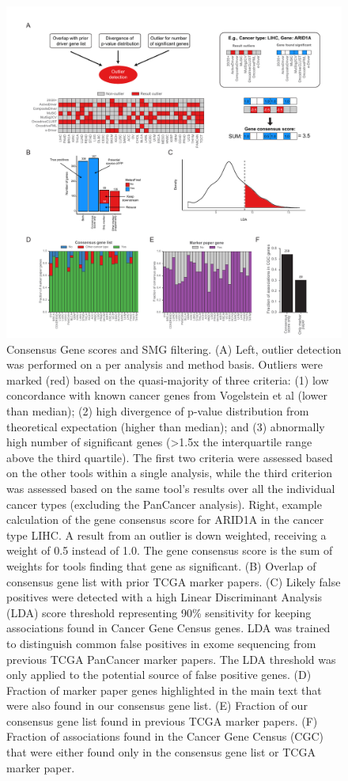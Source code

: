 \begin{figure}
  \centering
  \makeatletter
  \let\@currsize\normalsize
  \includegraphics[width=\linewidth]{figures/chapter7/driver_gene_approach.pdf}
  \caption[Consensus Gene scores and SMG filtering.]{Consensus Gene scores and SMG filtering. (A) Left, outlier detection was performed on a per analysis and method basis. Outliers were marked (red) based on the quasi-majority of three criteria: (1) low concordance with known cancer genes from Vogelstein et al (lower than median); (2) high divergence of p-value distribution from theoretical expectation (higher than median); and (3) abnormally high number of significant genes (>1.5x the interquartile range above the third quartile). The first two criteria were assessed based on the other tools within a single analysis, while the third criterion was assessed based on the same tool's results over all the individual cancer types (excluding the PanCancer analysis). Right, example calculation of the gene consensus score for ARID1A in the cancer type LIHC. A result from an outlier is down weighted, receiving a weight of 0.5 instead of 1.0. The gene consensus score is the sum of weights for tools finding that gene as significant. (B) Overlap of consensus gene list with prior TCGA marker papers. (C) Likely false positives were detected with a high Linear Discriminant Analysis (LDA) score threshold representing 90\% sensitivity for keeping associations found in Cancer Gene Census genes. LDA was trained to distinguish common false positives in exome sequencing from previous TCGA PanCancer marker papers. The LDA threshold was only applied to the potential source of false positive genes. (D) Fraction of marker paper genes highlighted in the main text that were also found in our consensus gene list. (E) Fraction of our consensus gene list found in previous TCGA marker papers.  (F) Fraction of associations found in the Cancer Gene Census (CGC) that were either found only in the consensus gene list or TCGA marker paper. }
  \label{fig:driver_gene_approach}
\end{figure}

